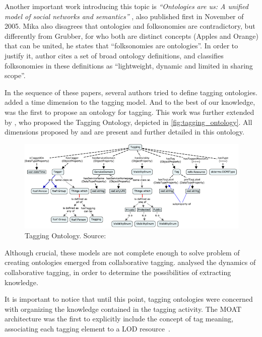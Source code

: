 Another important work introducing this topic is \emph{``Ontologies are us: A unified model of social networks and semantics''} \cite{Mika2007}, also published first in November of 2005.
Mika also disagrees that ontologies and folksonomies are contradictory, but differently from Grubber, for who both are distinct concepts (Apples and Orange) that can be united, he states that ``folksonomies are ontologies''.
In order to justify it, author cites a set of broad ontology definitions, and classifies folksonomies in these definitions as ``lightweight, dynamic and limited in sharing scope''.

In the sequence of these papers, several authors tried to define tagging ontologies.
 added a time dimension to the tagging model.
And to the best of our knowledge,  was the first to propose an ontology for tagging.
This work was further extended by , who proposed the Tagging Ontology, depicted in \autoref{fig:tagging_ontology}.
All dimensions proposed by  and  are present and further detailed in this ontology.

\begin{figure}[b]
\begin{center}
\includegraphics[width=\columnwidth]{images/tagging_ontology.png}
\caption[Tagging Ontology.]{Tagging Ontology. Source:  }
\label{fig:tagging_ontology}
\end{center}
\end{figure}

Although crucial, these models are not complete enough to solve problem of creating ontologies emerged from collaborative tagging.
 analysed the dynamics of collaborative tagging, in order to determine the possibilities of extracting knowledge.

It is important to notice that until this point, tagging ontologies were concerned with organizing the knowledge contained in the tagging activity.
The MOAT architecture was the first to explicitly include the concept of tag meaning, associating each tagging element to a LOD resource~\cite{Passant2008}.

